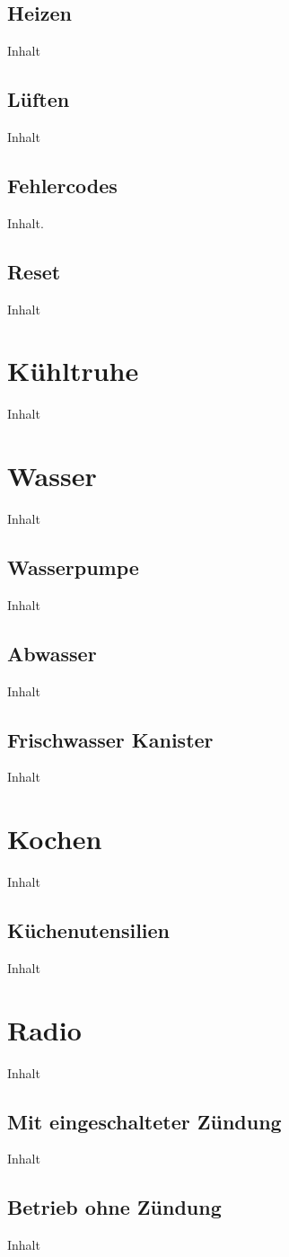 \subsection{Heizen}
Inhalt
\subsection{Lüften}
Inhalt
\subsection{Fehlercodes}
Inhalt.
\subsection{Reset}
Inhalt
\section{Kühltruhe}
Inhalt
\section{Wasser}
Inhalt
\subsection{Wasserpumpe}
Inhalt
\subsection{Abwasser}
Inhalt
\subsection{Frischwasser Kanister}
Inhalt
\section{Kochen}
Inhalt
\subsection{Küchenutensilien}
Inhalt
\section{Radio}
Inhalt
\subsection{Mit eingeschalteter Zündung}
Inhalt
\subsection{Betrieb ohne Zündung}
Inhalt
